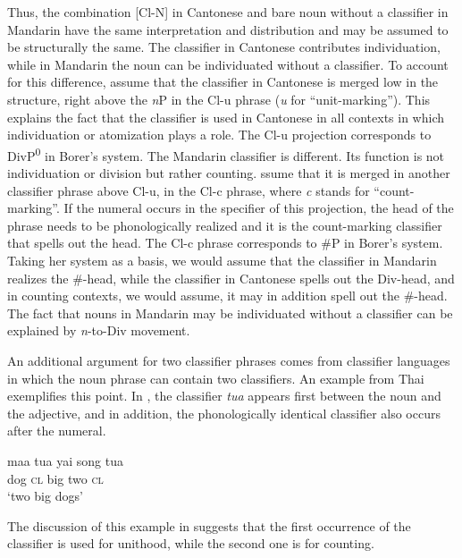 \documentclass[output=paper,colorlinks,citecolor=brown,
]{langscibook}
\begin{document}
\noindent Thus, the combination [Cl-N] in Cantonese and bare noun without a classifier in Mandarin have the same interpretation and distribution and may be assumed to be structurally the same. The classifier in Cantonese contributes individuation, while in Mandarin the noun can be individuated without a classifier. To account for this difference, \citet{ChengSybesma2014} assume that the classifier in Cantonese is merged low in the structure, right above the \textit{n}P in the Cl-u phrase (\textit{u} for ``unit-marking''). This explains the fact that the classifier is used in Cantonese in all contexts in which individuation or atomization plays a role. The Cl-u projection corresponds to DivP\textsuperscript{0} in Borer's system. The Mandarin classifier is different. Its function is not individuation or division but rather counting. \citeauthor{ChengSybesma2014} %
ssume that it is merged in another classifier phrase above Cl-u, in the Cl-c phrase, where \textit{c} stands for ``count-marking''. If the numeral occurs in the specifier of this projection, the head of the phrase needs to be phonologically realized and it is the count-marking classifier that spells out the head. The Cl-c phrase corresponds to \#P in Borer's system. Taking her system as a basis, we would assume that the classifier in Mandarin realizes the \#-head, while the classifier in Cantonese spells out the Div-head, and in counting contexts, we would assume, it may in addition spell out the \#-head. The fact that nouns in Mandarin may be individuated without a classifier can be explained by \textit{n}-to-Div movement. 

An additional argument for two classifier phrases comes from classifier languages in which the noun phrase can contain two classifiers. An example from Thai exemplifies this point. In , the classifier \textit{tua} appears first between the noun and the adjective, and in addition, the phonologically identical classifier also occurs after the numeral.

\ea\label{ex:5}
\gll maa tua yai song tua \\
dog \textsc{cl}	big two \textsc{cl} \\ 
\glt `two big dogs' \hfill \citep[Thai;][261]{ChengSybesma2014}
\z

\noindent The discussion of this example in \citet[261]{ChengSybesma2014} suggests that the first occurrence of the classifier is used for unithood, while the second one is for counting. 
\end{document}
